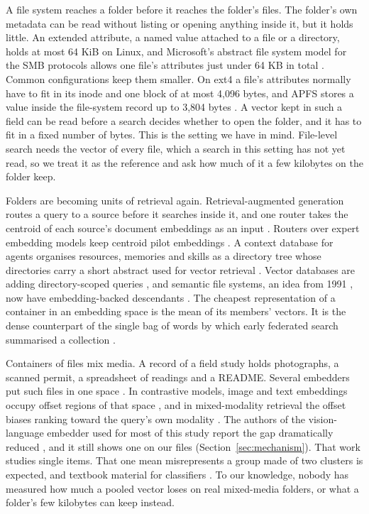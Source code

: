 \documentclass[11pt]{article}
\begin{document}
A file system reaches a folder before it reaches the folder's files. The folder's own metadata can be read without listing or opening anything inside it, but it holds little. An extended attribute, a named value attached to a file or a directory, holds at most 64 KiB on Linux, and Microsoft's abstract file system model for the SMB protocols allows one file's attributes just under 64 KB in total \citep{linux2026xattr,microsoft2025msfsa}. Common configurations keep them smaller. On ext4 a file's attributes normally have to fit in its inode and one block of at most 4,096 bytes, and APFS stores a value inside the file-system record up to 3,804 bytes \citep{linux2026xattr,e2fsprogs2025ext4,apple2020apfs}. A vector kept in such a field can be read before a search decides whether to open the folder, and it has to fit in a fixed number of bytes. This is the setting we have in mind. File-level search needs the vector of every file, which a search in this setting has not yet read, so we treat it as the reference and ask how much of it a few kilobytes on the folder keep.

Folders are becoming units of retrieval again. Retrieval-augmented generation routes a query to a source before it searches inside it, and one router takes the centroid of each source's document embeddings as an input \citep{dhasade2026ragroute}. Routers over expert embedding models keep centroid pilot embeddings \citep{lee2025routerretriever}. A context database for agents organises resources, memories and skills as a directory tree whose directories carry a short abstract used for vector retrieval \citep{openviking2026docs}. Vector databases are adding directory-scoped queries \citep{wang2026directoryaware}, and semantic file systems, an idea from 1991 \citep{gifford1991sfs}, now have embedding-backed descendants \citep{perone2025vectorvfs}. The cheapest representation of a container in an embedding space is the mean of its members' vectors. It is the dense counterpart of the single bag of words by which early federated search summarised a collection \citep{callan1995cori,shokouhi2011federated}.

Containers of files mix media. A record of a field study holds photographs, a scanned permit, a spreadsheet of readings and a README. Several embedders put such files in one space \citep{gunther2025jinav4,koukounas2024jinaclipv2,zhang2025gme,nussbaum2024nomicvision}. In contrastive models, image and text embeddings occupy offset regions of that space \citep{liang2022mindgap}, and in mixed-modality retrieval the offset biases ranking toward the query's own modality \citep{li2025grclip}. The authors of the vision-language embedder used for most of this study report the gap dramatically reduced \citep{gunther2025jinav4}, and it still shows one on our files (Section~\ref{sec:mechanism}). That work studies single items. That one mean misrepresents a group made of two clusters is expected, and textbook material for classifiers \citep{manning2008iir}. To our knowledge, nobody has measured how much a pooled vector loses on real mixed-media folders, or what a folder's few kilobytes can keep instead.
\end{document}
